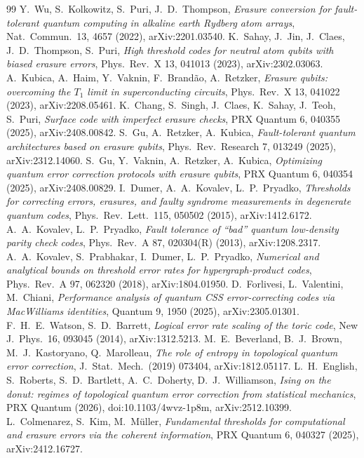 \documentclass[a4paper,11pt]{article}
\theoremstyle{plain}
\theoremstyle{definition}
\theoremstyle{remark}
\begin{document}
\begin{thebibliography}{99}
 Y.~Wu, S.~Kolkowitz, S.~Puri, J.~D.~Thompson, \emph{Erasure conversion for fault-tolerant quantum computing in alkaline earth Rydberg atom arrays}, Nat.\ Commun.\ 13, 4657 (2022), arXiv:2201.03540.
 K.~Sahay, J.~Jin, J.~Claes, J.~D.~Thompson, S.~Puri, \emph{High threshold codes for neutral atom qubits with biased erasure errors}, Phys.\ Rev.\ X 13, 041013 (2023), arXiv:2302.03063.
 A.~Kubica, A.~Haim, Y.~Vaknin, F.~Brand\~ao, A.~Retzker, \emph{Erasure qubits: overcoming the $T_1$ limit in superconducting circuits}, Phys.\ Rev.\ X 13, 041022 (2023), arXiv:2208.05461.
 K.~Chang, S.~Singh, J.~Claes, K.~Sahay, J.~Teoh, S.~Puri, \emph{Surface code with imperfect erasure checks}, PRX Quantum 6, 040355 (2025), arXiv:2408.00842.
 S.~Gu, A.~Retzker, A.~Kubica, \emph{Fault-tolerant quantum architectures based on erasure qubits}, Phys.\ Rev.\ Research 7, 013249 (2025), arXiv:2312.14060.
 S.~Gu, Y.~Vaknin, A.~Retzker, A.~Kubica, \emph{Optimizing quantum error correction protocols with erasure qubits}, PRX Quantum 6, 040354 (2025), arXiv:2408.00829.
 I.~Dumer, A.~A.~Kovalev, L.~P.~Pryadko, \emph{Thresholds for correcting errors, erasures, and faulty syndrome measurements in degenerate quantum codes}, Phys.\ Rev.\ Lett.\ 115, 050502 (2015), arXiv:1412.6172.
 A.~A.~Kovalev, L.~P.~Pryadko, \emph{Fault tolerance of ``bad'' quantum low-density parity check codes}, Phys.\ Rev.\ A 87, 020304(R) (2013), arXiv:1208.2317.
 A.~A.~Kovalev, S.~Prabhakar, I.~Dumer, L.~P.~Pryadko, \emph{Numerical and analytical bounds on threshold error rates for hypergraph-product codes}, Phys.\ Rev.\ A 97, 062320 (2018), arXiv:1804.01950.
 D.~Forlivesi, L.~Valentini, M.~Chiani, \emph{Performance analysis of quantum CSS error-correcting codes via MacWilliams identities}, Quantum 9, 1950 (2025), arXiv:2305.01301.
 F.~H.~E.~Watson, S.~D.~Barrett, \emph{Logical error rate scaling of the toric code}, New J.\ Phys.\ 16, 093045 (2014), arXiv:1312.5213.
 M.~E.~Beverland, B.~J.~Brown, M.~J.~Kastoryano, Q.~Marolleau, \emph{The role of entropy in topological quantum error correction}, J.\ Stat.\ Mech.\ (2019) 073404, arXiv:1812.05117.
 L.~H.~English, S.~Roberts, S.~D.~Bartlett, A.~C.~Doherty, D.~J.~Williamson, \emph{Ising on the donut: regimes of topological quantum error correction from statistical mechanics}, PRX Quantum (2026), doi:10.1103/4wvz-1p8m, arXiv:2512.10399.
 L.~Colmenarez, S.~Kim, M.~M\"uller, \emph{Fundamental thresholds for computational and erasure errors via the coherent information}, PRX Quantum 6, 040327 (2025), arXiv:2412.16727.

\end{thebibliography}
\end{document}
